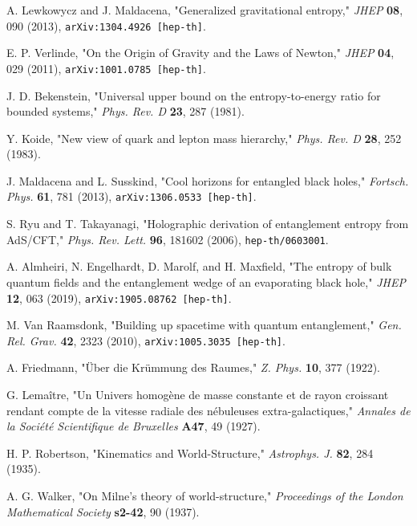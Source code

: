 \documentclass[11pt, letterpaper]{report}
\theoremstyle{plain} %
\theoremstyle{definition} %
\theoremstyle{remark} %
\begin{document}
\begin{thebibliography}{99}
A. Lewkowycz and J. Maldacena, "Generalized gravitational entropy," \textit{JHEP} \textbf{08}, 090 (2013), \texttt{arXiv:1304.4926 [hep-th]}.

E. P. Verlinde, "On the Origin of Gravity and the Laws of Newton," \textit{JHEP} \textbf{04}, 029 (2011), \texttt{arXiv:1001.0785 [hep-th]}.

J. D. Bekenstein, "Universal upper bound on the entropy-to-energy ratio for bounded systems," \textit{Phys. Rev. D} \textbf{23}, 287 (1981).

Y. Koide, "New view of quark and lepton mass hierarchy," \textit{Phys. Rev. D} \textbf{28}, 252 (1983).

J. Maldacena and L. Susskind, "Cool horizons for entangled black holes," \textit{Fortsch. Phys.} \textbf{61}, 781 (2013), \texttt{arXiv:1306.0533 [hep-th]}.

\label{Ryu2006Holographic}
S. Ryu and T. Takayanagi, "Holographic derivation of entanglement entropy from AdS/CFT," \textit{Phys. Rev. Lett.} \textbf{96}, 181602 (2006), \texttt{hep-th/0603001}.

\label{Almheiri2019Islands}
A. Almheiri, N. Engelhardt, D. Marolf, and H. Maxfield, "The entropy of bulk quantum fields and the entanglement wedge of an evaporating black hole," \textit{JHEP} \textbf{12}, 063 (2019), \texttt{arXiv:1905.08762 [hep-th]}.

M. Van Raamsdonk, "Building up spacetime with quantum entanglement," \textit{Gen. Rel. Grav.} \textbf{42}, 2323 (2010), \texttt{arXiv:1005.3035 [hep-th]}.

A. Friedmann, "Über die Krümmung des Raumes," \textit{Z. Phys.} \textbf{10}, 377 (1922).

G. Lemaître, "Un Univers homogène de masse constante et de rayon croissant rendant compte de la vitesse radiale des nébuleuses extra-galactiques," \textit{Annales de la Société Scientifique de Bruxelles} \textbf{A47}, 49 (1927).

H. P. Robertson, "Kinematics and World-Structure," \textit{Astrophys. J.} \textbf{82}, 284 (1935).

A. G. Walker, "On Milne’s theory of world-structure," \textit{Proceedings of the London Mathematical Society} \textbf{s2-42}, 90 (1937).


\end{thebibliography}
\end{document}
